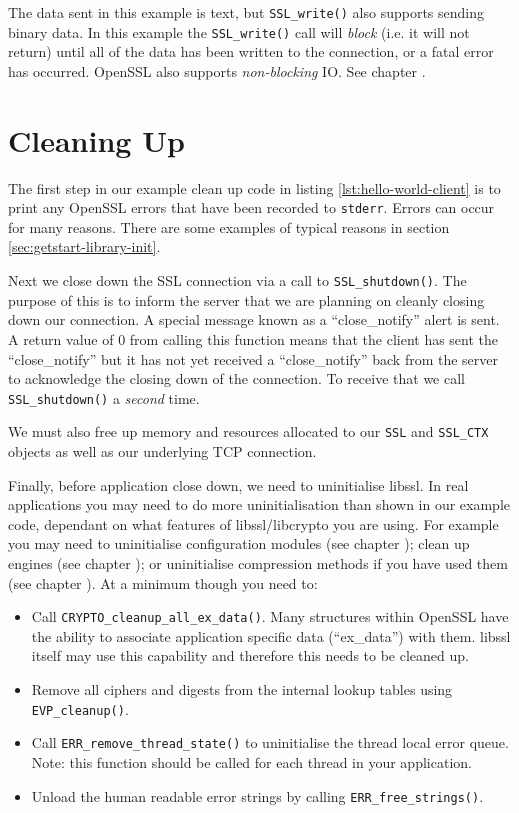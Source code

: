 The data sent in this example is text, but \verb!SSL_write()! also supports 
sending binary data. In this example the \verb!SSL_write()! call will
\emph{block} (i.e. it will not return) until all of the data has been written
to the connection, or a fatal error has occurred. OpenSSL also supports
\emph{non-blocking} IO. See chapter .

\section{Cleaning Up}

The first step in our example clean up code in listing
\ref{lst:hello-world-client} is to print any OpenSSL errors that have been 
recorded to \verb!stderr!. Errors can occur for many reasons. There are some
examples of typical reasons in section \ref{sec:getstart-library-init}.

Next we close down the SSL connection via a call to \verb!SSL_shutdown()!. The 
purpose of this is to inform the server that we are planning on cleanly closing 
down our connection. A special message known as a ``close\_notify'' alert is 
sent. A return value of 0 from calling this function means that the client has 
sent the ``close\_notify'' but it has not yet received a ``close\_notify'' back 
from the server to acknowledge the closing down of the connection. To receive 
that we call \verb!SSL_shutdown()! a \emph{second} time.

We must also free up memory and resources allocated to our \verb!SSL! and
\verb!SSL_CTX! objects as well as our underlying TCP connection.

Finally, before application close down, we need to uninitialise libssl. In 
real applications you may need to do more uninitialisation than shown in our 
example code, dependant on what features of libssl/libcrypto you are using. For 
example you may need to uninitialise configuration modules (see chapter
); clean up engines (see chapter ); or
uninitialise compression methods if you have used them (see chapter ). 
At a minimum though you need to:
\begin{itemize}
\item Call \texttt{CRYPTO\_cleanup\_all\_ex\_data()}. Many structures within
OpenSSL have the ability to associate application specific data  (``ex\_data'')
with them. libssl itself may use this capability and therefore  this needs to be
cleaned up.
\item Remove all ciphers and digests from the internal lookup tables using 
\texttt{EVP\_cleanup()}.
\item Call \texttt{ERR\_remove\_thread\_state()} to uninitialise the thread
local error queue. Note: this function should be called for each thread in your
application.
\item Unload the human readable error strings by calling 
\texttt{ERR\_free\_strings()}.
\end{itemize}

